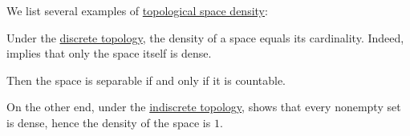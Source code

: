 \begin{example}\label{ex:def:topological_space_density}
  We list several examples of \hyperref[def:topological_space_density]{topological space density}:
  \begin{thmenum}
     Under the \hyperref[def:discrete_topology]{discrete topology}, the density of a space equals its cardinality. Indeed,  implies that only the space itself is dense.

    Then the space is separable if and only if it is countable.

     On the other end, under the \hyperref[def:indiscrete_topology]{indiscrete topology},  shows that every nonempty set is dense, hence the density of the space is \( 1 \).
  \end{thmenum}
\end{example}

